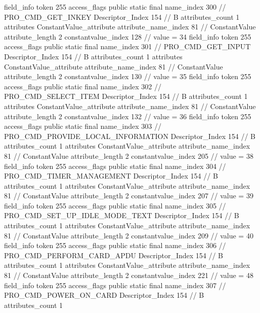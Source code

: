 {{{{{			}
			field_info {
				token	255
				access_flags	public static final
				name_index	300		// PRO_CMD_GET_INKEY
				Descriptor_Index	154		// B
				attributes_count	1
				attributes {
				ConstantValue_attribute {
					attribute_name_index	81		// ConstantValue
					attribute_length	2
					constantvalue_index	128		// value = 34
				}
				}
			}
			field_info {
				token	255
				access_flags	public static final
				name_index	301		// PRO_CMD_GET_INPUT
				Descriptor_Index	154		// B
				attributes_count	1
				attributes {
				ConstantValue_attribute {
					attribute_name_index	81		// ConstantValue
					attribute_length	2
					constantvalue_index	130		// value = 35
				}
				}
			}
			field_info {
				token	255
				access_flags	public static final
				name_index	302		// PRO_CMD_SELECT_ITEM
				Descriptor_Index	154		// B
				attributes_count	1
				attributes {
				ConstantValue_attribute {
					attribute_name_index	81		// ConstantValue
					attribute_length	2
					constantvalue_index	132		// value = 36
				}
				}
			}
			field_info {
				token	255
				access_flags	public static final
				name_index	303		// PRO_CMD_PROVIDE_LOCAL_INFORMATION
				Descriptor_Index	154		// B
				attributes_count	1
				attributes {
				ConstantValue_attribute {
					attribute_name_index	81		// ConstantValue
					attribute_length	2
					constantvalue_index	205		// value = 38
				}
				}
			}
			field_info {
				token	255
				access_flags	public static final
				name_index	304		// PRO_CMD_TIMER_MANAGEMENT
				Descriptor_Index	154		// B
				attributes_count	1
				attributes {
				ConstantValue_attribute {
					attribute_name_index	81		// ConstantValue
					attribute_length	2
					constantvalue_index	207		// value = 39
				}
				}
			}
			field_info {
				token	255
				access_flags	public static final
				name_index	305		// PRO_CMD_SET_UP_IDLE_MODE_TEXT
				Descriptor_Index	154		// B
				attributes_count	1
				attributes {
				ConstantValue_attribute {
					attribute_name_index	81		// ConstantValue
					attribute_length	2
					constantvalue_index	209		// value = 40
				}
				}
			}
			field_info {
				token	255
				access_flags	public static final
				name_index	306		// PRO_CMD_PERFORM_CARD_APDU
				Descriptor_Index	154		// B
				attributes_count	1
				attributes {
				ConstantValue_attribute {
					attribute_name_index	81		// ConstantValue
					attribute_length	2
					constantvalue_index	221		// value = 48
				}
				}
			}
			field_info {
				token	255
				access_flags	public static final
				name_index	307		// PRO_CMD_POWER_ON_CARD
				Descriptor_Index	154		// B
				attributes_count	1
}}}}}
